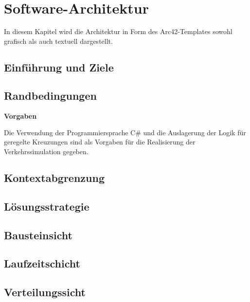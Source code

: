 
\chapter{Software-Architektur}
\label{Software-Architektur}

In diesem Kapitel wird die Architektur in Form des Arc42-Templates sowohl grafisch als auch textuell dargestellt. 

\thispagestyle{standard}
\pagestyle{standard}

\section{Einführung und Ziele}
\label{Einführung und Ziele}



\section{Randbedingungen}
\label{Randbedingungen}


\begin{flushleft}
\textbf{Vorgaben}
\end{flushleft}
\vspace{-0.3 cm}

Die Verwendung der Programmiersprache C\# und die Auslagerung der Logik für geregelte Kreuzungen sind als Vorgaben für die Realisierung der Verkehrssimulation gegeben.

\section{Kontextabgrenzung}
\label{Kontextabgrenzung}

\section{Lösungsstrategie}
\label{Lösungsstrategie}

\section{Bausteinsicht}
\label{Bausteinsicht}

\section{Laufzeitschicht}
\label{Laufzeitschicht}

\section{Verteilungssicht}
\label{Verteilungssicht}

